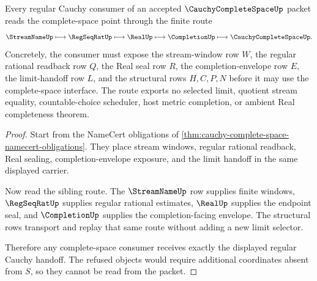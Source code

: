 \begin{theorem}
\label{thm:cauchy-complete-space-regular-cauchy-handoff}
Every regular Cauchy consumer of an accepted $\CauchyCompleteSpaceUp$ packet reads the complete-space point through the finite route
$$
\StreamNameUp\longmapsto\RegSeqRatUp\longmapsto\RealUp\longmapsto\CompletionUp\longmapsto\CauchyCompleteSpaceUp .
$$
Concretely, the consumer must expose the stream-window row $W$, the regular rational readback row $Q$, the Real seal row $R$, the completion-envelope row $E$, the limit-handoff row $L$, and the structural rows $H,C,P,N$ before it may use the complete-space interface. The route exports no selected limit, quotient stream equality, countable-choice scheduler, host metric completion, or ambient Real completeness theorem.
\end{theorem}
\begin{proof}
Start from the NameCert obligations of \autoref{thm:cauchy-complete-space-namecert-obligations}. They place stream windows, regular rational readback, Real sealing, completion-envelope exposure, and the limit handoff in the same displayed carrier.

Now read the sibling route. The $\StreamNameUp$ row supplies finite windows, $\RegSeqRatUp$ supplies regular rational estimates, $\RealUp$ supplies the endpoint seal, and $\CompletionUp$ supplies the completion-facing envelope. The structural rows transport and replay that same route without adding a new limit selector.

Therefore any complete-space consumer receives exactly the displayed regular Cauchy handoff. The refused objects would require additional coordinates absent from $S$, so they cannot be read from the packet.
\end{proof}


\begin{closurestatus}{\CauchyCompleteSpaceUp}
  \theoryclosure{\seedClosure}
  \formalstatus{\unformalizedV}
\end{closurestatus}
